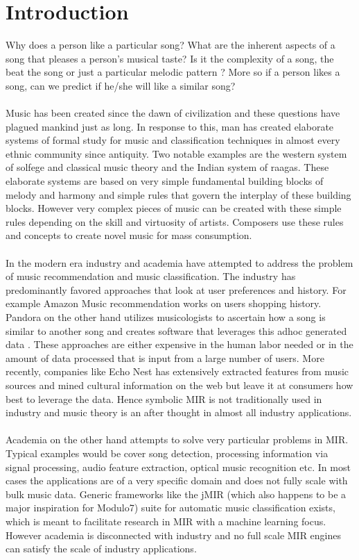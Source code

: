 \chapter{Introduction}
\label{sec:intro}

\noindent Why does a person like a particular song? What are the inherent aspects of a song that pleases a person's musical taste? Is it the complexity of a song, the beat the song or just a particular melodic pattern ? More so if a person likes a song, can we predict if he/she will like a similar song? \\\\
Music has been created since the dawn of civilization and these questions have plagued mankind just as long. In response to this, man has created elaborate systems of formal study for music and classification techniques in almost every ethnic community since antiquity. Two notable examples are the western system of solfege and classical music theory and the Indian system of raagas. These elaborate systems are based on very simple fundamental building blocks of melody and harmony and simple rules that govern the interplay of these building blocks. However very complex pieces of music can be created with these simple rules depending on the skill and virtuosity of artists. Composers use these rules and concepts to create novel music for mass consumption. \\\\
In the modern era industry and academia have attempted to address the problem of music recommendation and music classification. The industry has predominantly favored approaches that look at user preferences and history. For example Amazon Music recommendation works on users shopping history. Pandora on the other hand utilizes musicologists to ascertain how a song is similar to another song and creates software that leverages this adhoc generated data \cite{musicgenomepandora}. These approaches are either expensive in the human labor needed or in the amount of data processed that is input from a large number of users. More recently, companies like Echo Nest has extensively extracted features from music sources \cite{echonestfingerprint} and mined cultural information on the web but leave it at consumers how best to leverage the data. Hence symbolic MIR is not traditionally used in industry and music theory is an after thought in almost all industry applications. \\\\
Academia on the other hand attempts to solve very particular problems in MIR. Typical examples would be cover song detection, processing information via signal processing, audio feature extraction, optical music recognition etc. In most cases the applications are of a very specific domain and does not fully scale with bulk music data. Generic frameworks like the jMIR \cite{jMIR} (which also happens to be a major inspiration for Modulo7) suite for automatic music classification exists, which is meant to facilitate research in MIR with a machine learning focus. However academia is disconnected with industry and no full scale MIR engines can satisfy the scale of industry applications. \\\\
